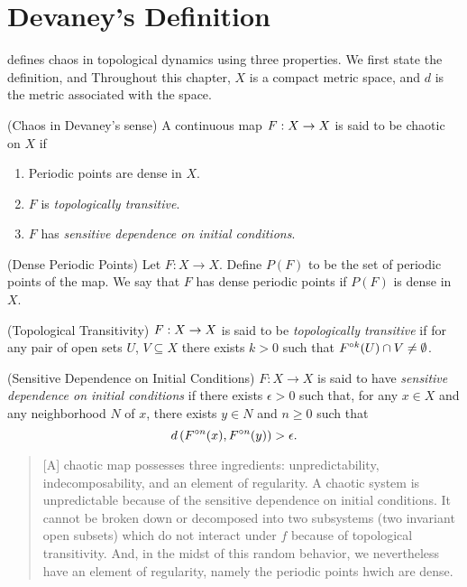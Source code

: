 \documentclass[12pt,draft,twoside]{article}
\begin{document}
\chapter{Devaney's Definition}
\label{chap:devaney}
\citet{devaney} defines chaos in topological dynamics using three properties.
We first state the definition, and 
Throughout this chapter, $X$ is a compact metric space, and $d$ is the metric associated with the space.
\begin{definition}
  (Chaos in Devaney's sense) 
  A continuous map $F: X\rightarrow X$ is said to be chaotic on $X$ if
  \begin{enumerate}
    \item Periodic points are dense in $X$.
    \item $F$ is \textit{topologically transitive}.
    \item $F$ has \textit{sensitive dependence on initial conditions}.
  \end{enumerate}
\end{definition}
%
\begin{definition}
  (Dense Periodic Points) 
  Let $F: X \to X$.
  Define $P(F)$ to be the set of periodic points of the map.
  We say that $F$ has dense periodic points if $P(F)$ is dense in $X$.
\end{definition}
%
\begin{definition}
  (Topological Transitivity) 
  $F: X \rightarrow X$ is said to be \textit{topologically transitive} if for any pair of open sets $U$, $V \subseteq X$ there exists $k > 0$ such that $F^{\circ k}(U) \cap V \neq \emptyset$.
  \label{defn:transitivity}
\end{definition}
%
\begin{definition}
  (Sensitive Dependence on Initial Conditions) 
  $F: X \rightarrow X$ is said to have \textit{sensitive dependence on initial conditions} if there exists $\epsilon > 0$ such that, for any $x \in X$ and any neighborhood $N$ of $x$, there exists $y\in N$ and $n\geq 0$ such that 
  \begin{equation*}
    d\left( F^{\circ n}(x), F^{\circ n}(y) \right) > \epsilon.
  \end{equation*}
  \label{defn:sdic}
\end{definition}
%
\citet[p.50]{devaney}
\begin{quotation}
  [A] chaotic map possesses three ingredients:
  unpredictability, indecomposability, and an element of regularity.
  A chaotic system is unpredictable because of the sensitive dependence on initial conditions.
  It cannot be broken down or decomposed into two subsystems (two invariant open subsets) which do not interact under $f$ because of topological transitivity.
  And, in the midst of this random behavior, we nevertheless have an element of regularity, namely the periodic points hwich are dense.
\end{quotation}
\end{document}
